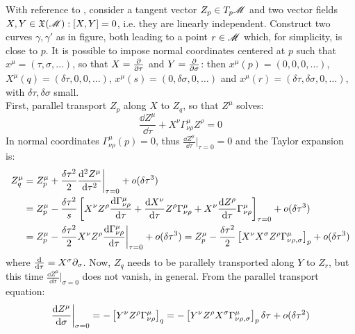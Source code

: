 With reference to , consider a tangent vector $ Z_p \in T_p \mathscr{M} $ and two vector fields $ X,Y \in \mathfrak{X}(\mathscr{M}) : [X,Y] = 0 $, i.e. they are linearly independent. Construct two curves $ \gamma, \gamma' $ as in figure, both leading to a point $ r \in \mathscr{M} $ which, for simplicity, is close to $ p $. It is possible to impose normal coordinates centered at $ p $ such that $ x^\mu = (\tau, \sigma, \dots) $, so that $ X = \frac{\partial}{\partial \tau} $ and $ Y = \frac{\partial}{\partial \sigma} $: then $ x^\mu(p) = (0,0,0, \dots) $, $ X^\mu(q) = (\delta \tau, 0, 0, \dots) $, $ x^\mu(s) = (0, \delta \sigma, 0, \dots) $ and $ x^\mu(r) = (\delta \tau, \delta \sigma, 0, \dots)$, with $ \delta \tau, \delta \sigma $ small.\\
First, parallel transport $ Z_p $ along $ X $ to $ Z_q $, so that $ Z^\mu $ solves:
\begin{equation*}
  \frac{\dd Z^\mu}{\dd \tau} + X^\nu \Gamma^\mu_{\nu \rho} Z^\rho = 0
\end{equation*}
In normal coordinates $ \Gamma^\mu_{\nu \rho}(p) = 0 $, thus $ \frac{\dd Z^\mu}{\dd \tau}\big\vert_{\tau = 0} = 0 $ and the Taylor expansion is:
\begin{equation*}
  \begin{split}
    Z_q^\mu
    &= Z_p^\mu + \frac{\delta \tau^2}{2} \frac{\mathrm{d}^2 Z^\mu}{\mathrm{d} \tau^2}\bigg\vert_{\tau = 0} + o(\delta\tau^3) \\
    &= Z_p^\mu - \frac{\delta\tau^2}{s} \left[ X^\nu Z^\rho \frac{\mathrm{d} \Gamma^\mu_{\nu \rho}}{\mathrm{d} \tau} + \frac{\mathrm{d} X^\nu}{\mathrm{d} \tau} Z^\rho \Gamma^\mu_{\nu \rho} + X^\nu \frac{\mathrm{d} Z^\rho}{\mathrm{d} \tau} \Gamma^\mu_{\nu \rho} \right]_{\tau = 0} + o(\delta\tau^3) \\
    &= Z_p^\mu - \frac{\delta\tau^2}{2} X^\nu Z^\rho \frac{\mathrm{d} \Gamma^\mu_{\nu \rho}}{\mathrm{d} \tau}\bigg\vert_{\tau = 0} + o(\delta\tau^3) = Z_p^\mu - \frac{\delta\tau^2}{2} \left[ X^\nu X^\sigma Z^\rho \Gamma^\mu_{\nu \rho , \sigma} \right]_p + o(\delta\tau^3)
  \end{split}
\end{equation*}
where $ \frac{\mathrm{d}}{\mathrm{d} \tau} = X^\sigma \partial_\sigma $. Now, $ Z_q $ needs to be parallely transported along $ Y $ to $ Z_r $, but this time $ \frac{\dd Z^\mu}{\dd \sigma}\big\vert_{\sigma = 0} $ does not vanish, in general. From the parallel transport equation:
\begin{equation*}
  \frac{\mathrm{d} Z^\mu}{\mathrm{d} \sigma}\bigg\vert_{\sigma = 0} = - \left[ Y^\nu Z^\rho \Gamma^\mu_{\nu \rho} \right]_q = - \left[ Y^\nu Z^\rho X^\sigma \Gamma^\mu_{\nu \rho , \sigma} \right]_p \delta \tau + o(\delta\tau^2)
\end{equation*}
